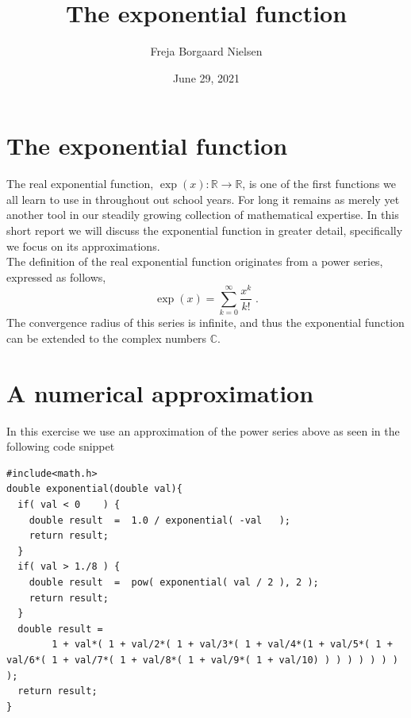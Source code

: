 \documentclass[twocolumn]{article}
\title{\textbf{The exponential function}}
\author{Freja Borgaard Nielsen}
\date{June 29, 2021}
\begin{document}
\maketitle
\section{The exponential function}
The real exponential function, $\exp(x): \mathbb{R}\rightarrow\mathbb{R}$, is one of the first functions we all learn to use in throughout out school years. For long it remains as merely yet another tool in our steadily growing collection of mathematical expertise. In this short report we will discuss the exponential function in greater detail, specifically we focus on its approximations.\\
The definition of the real exponential function originates from a power series, expressed as follows,
\begin{equation}\label{eq:power}
	\exp(x) = \sum_{k=0}^\infty \frac{x^k}{k!} \;.
\end{equation}
The convergence radius of this series is infinite, and thus the exponential function can be extended to the complex numbers $\mathbb{C}$. 

\section{A numerical approximation}
In this exercise we use an approximation of the power series above as seen in the following code snippet

\begin{lstlisting}
#include<math.h>
double exponential(double val){
  if( val < 0    ) {
    double result  =  1.0 / exponential( -val   );
    return result;
  }
  if( val > 1./8 ) {
    double result  =  pow( exponential( val / 2 ), 2 );
    return result;
  }
  double result =
		1 + val*( 1 + val/2*( 1 + val/3*( 1 + val/4*(1 + val/5*( 1 + val/6*( 1 + val/7*( 1 + val/8*( 1 + val/9*( 1 + val/10) ) ) ) ) ) ) ) );
  return result;
}

\end{lstlisting}
\end{document}
